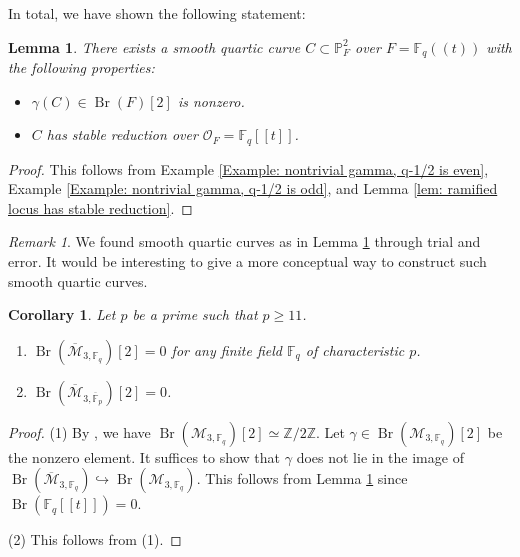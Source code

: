 \documentclass{amsart}
\newtheorem{lem}[prop]{Lemma}
\newtheorem{cor}[prop]{Corollary}
\theoremstyle{definition}
\theoremstyle{remark}
\newtheorem{remark}[prop]{Remark}
\DeclareMathOperator{\Br}{Br}
\newcommand{\PP}{\mathbb P}
\newcommand{\ZZ}{\mathbb Z}
\newcommand{\Fq}{\mathbb F_q}
\newcommand{\Fbar}{\overline{\mathbb F}_p}
\begin{document}
In total, we have shown the following statement:

\begin{lem}\label{Lemma: stable curve with nontrivial Brauer class}
There exists a smooth quartic curve $C \subset \PP^2_{F}$ over $F=\Fq((t))$ with the following properties:
    \begin{itemize}
        \item $\gamma(C) \in \Br(F)[2]$ is nonzero.
        \item $C$ has stable reduction over $\mathcal{O}_F=\Fq[[t]]$.
    \end{itemize}
\end{lem}

\begin{proof}
    This follows from Example \ref{Example: nontrivial gamma, q-1/2 is even}, Example \ref{Example: nontrivial gamma, q-1/2 is odd}, and Lemma \ref{lem: ramified locus has stable reduction}.
\end{proof}

\begin{remark}
    We found smooth quartic curves as in Lemma \ref{Lemma: stable curve with nontrivial Brauer class} through trial and error.
    It would be interesting to give a more conceptual way to construct such smooth quartic curves.
\end{remark}



\begin{cor}\label{Corollary: g=3 in positive characteristic}
    Let $p$ be a prime such that $p \geq 11$.
    \begin{enumerate}
        \item $\Br(\overline{\mathcal{M}}_{3, \Fq})[2]=0$ for any finite field $\Fq$ of characteristic $p$.
        \item $\Br(\overline{\mathcal{M}}_{3, \Fbar})[2]=0$.
    \end{enumerate}
\end{cor}

\begin{proof}
    (1) By \cite{Lorenzo-Pirisi}, we have $\Br(\mathcal{M}_{3, \Fq})[2] \simeq \ZZ/2\ZZ$.
    Let $\gamma \in \Br(\mathcal{M}_{3, \Fq})[2]$ be the nonzero element.
    It suffices to show that $\gamma$ does not lie in the image of $\Br(\overline{\mathcal{M}}_{3, \Fq}) \hookrightarrow \Br(\mathcal{M}_{3, \Fq})$.
    This follows from Lemma \ref{Lemma: stable curve with nontrivial Brauer class} since $\Br(\mathbb{F}_{q}[[t]])=0$.

    (2) This follows from (1).
\end{proof}
\end{document}
